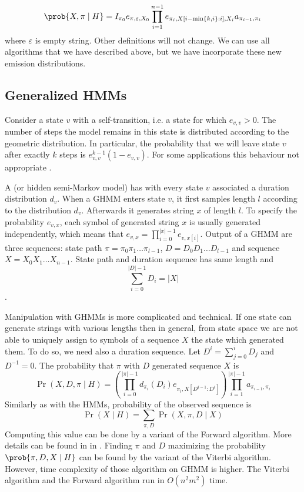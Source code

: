 \[
\prob{X,\pi\mid H} = 
I_{\pi_0}e_{\pi,\varepsilon,X_0}\prod_{i=1}^{n-1}
e_{\pi_i,X[i-\min\{k,i\}:i],X_i}a_{\pi_{i-1},\pi_i}
\]
where $\varepsilon$ is empty string. Other definitions will not change. We can
use all algorithms that we have described above, but we have incorporate these
new emission distributions.

\subsection{Generalized HMMs}

Consider a state $v$ with a self-transition, i.e. a state for which $e_{v,v}>0$.
The number of steps the model remains in this state is distributed according to
the geometric distribution.
In particular, the probability that we will leave state $v$ after exactly $k$ steps is
$e_{v,v}^{k-1}(1-e_{v,v})$. For some
applications this behaviour not
appropriate \cite{Burge1997,Majoros2004}.

A  (or hidden semi-Markov model)
has with every state $v$ associated a duration distribution $d_v$.  When
a GHMM enters state $v$, it first samples length $l$ according
to the distribution $d_v$.  Afterwards it generates string $x$ of length $l$.  To
specify the probability $e_{v,x}$, each symbol of generated string $x$ is usually
generated independently, which means that $e_{v,x}=\prod_{i=0}^{|x|-1}e_{v,x[i]}$.
Output of a GHMM are three sequences: state path $\pi=\pi_0\pi_1\dots\pi_{l-1}$,
 $D=D_0D_1\dots D_{l-1}$ and sequence
$X=X_0X_1\dots X_{n-1}$.  State path and duration sequence has same
length and \[\sum_{i=0}^{|D|-1}D_i = |X|\].

Manipulation with GHMMs is  more complicated and technical. If one state can
generate strings with various lengths then in general, from state space we are
not able to uniquely assign to symbols of a sequence $X$ the state which 
generated them.
To do so, we need also a duration sequence.
Let $D^i = \sum_{j=0}^{i}D_j$ and $D^{-1}=0$.
The probability that $\pi$ with $D$ generated sequence $X$ is
\begin{equation}
\Pr(X,D,\pi\mid H) = 
\left(
\prod_{i=0}^{|\pi|-1}
d_{\pi_i}(D_i)e_{\pi_i,X[D^{i-1}:D^i]}
\right)
\prod_{i=1}^{|\pi|-1}
a_{\pi_{i-1},\pi_i}
\end{equation}
Similarly as with the HMMs,  probability of the observed
sequence is
\begin{equation}
\Pr\left(X\mid H\right) = \sum_{\pi,D}\Pr\left(X,\pi,D\mid X\right)
\end{equation}
Computing this value can be done by a variant of the Forward algorithm. More
details can be found in  in \cite{Burge1997,Majoros2004}. Finding $\pi$ and $D$
maximizing the probability $\prob{\pi,D,X\mid H}$ can be found by the variant of
the Viterbi algorithm. However, time complexity of those algorithm on GHMM is
higher. The Viterbi algorithm and the Forward algorithm run in $O(n^2m^2)$ time.

